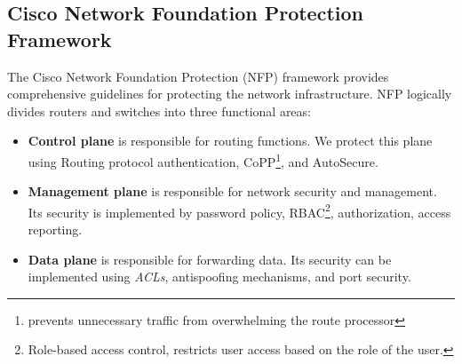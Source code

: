 \subsection{Cisco Network Foundation Protection Framework}

The Cisco Network Foundation Protection (NFP) framework provides comprehensive guidelines for protecting the network infrastructure.  NFP logically divides routers and switches into three functional areas:

\begin{itemize}

\item\textbf{Control plane} is responsible for routing functions. We protect this plane using Routing protocol authentication, CoPP\footnote{prevents unnecessary traffic from overwhelming the route processor}, and AutoSecure.

\item\textbf{Management plane} is responsible for network security and management. Its security is implemented by password policy, RBAC\footnote{Role-based access control, restricts user access based on the role of the user.}, authorization, access reporting.

\item\textbf{Data plane} is responsible for forwarding data. Its security can be implemented using \emph{ACLs}, antispoofing mechanisms, and port security. 

\end{itemize}